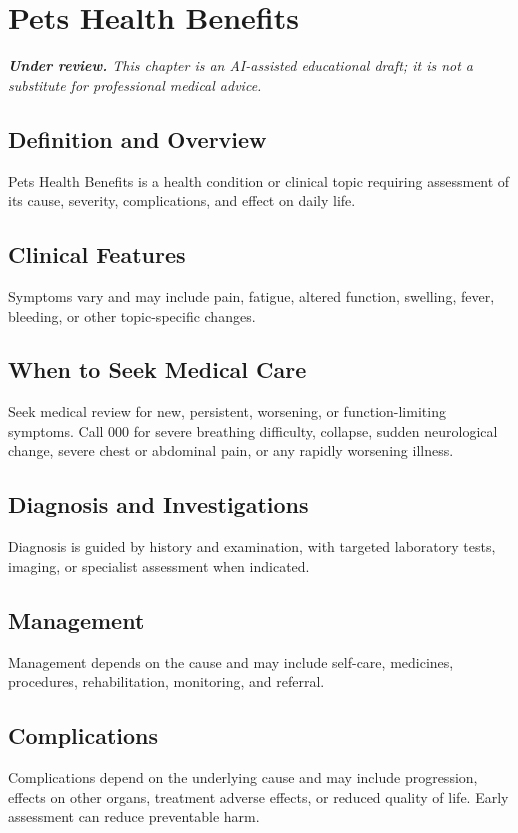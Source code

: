 \chapter{Pets Health Benefits}

\medskip
\noindent\textit{\textbf{Under review.} This chapter is an AI-assisted educational draft; it is not a substitute for professional medical advice.}

\section*{Definition and Overview}
Pets Health Benefits is a health condition or clinical topic requiring assessment of its cause, severity, complications, and effect on daily life.

\section*{Clinical Features}
Symptoms vary and may include pain, fatigue, altered function, swelling, fever, bleeding, or other topic-specific changes.

\section*{When to Seek Medical Care}
Seek medical review for new, persistent, worsening, or function-limiting symptoms. Call 000 for severe breathing difficulty, collapse, sudden neurological change, severe chest or abdominal pain, or any rapidly worsening illness.

\section*{Diagnosis and Investigations}
Diagnosis is guided by history and examination, with targeted laboratory tests, imaging, or specialist assessment when indicated.

\section*{Management}
Management depends on the cause and may include self-care, medicines, procedures, rehabilitation, monitoring, and referral.

\section*{Complications}
Complications depend on the underlying cause and may include progression, effects on other organs, treatment adverse effects, or reduced quality of life. Early assessment can reduce preventable harm.

